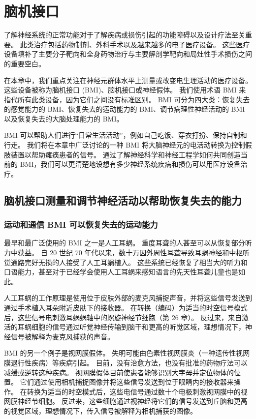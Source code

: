 \chapter{脑机接口}
了解神经系统的正常功能对于了解疾病或损伤引起的功能障碍以及设计疗法至关重要。 此类治疗包括药物制剂、外科手术以及越来越多的电子医疗设备。 这些医疗设备填补了主要分子靶向和全身药物治疗与主要解剖学靶向和局灶性手术损伤之间的重要空白。

在本章中，我们重点关注在神经元群体水平上测量或改变电生理活动的医疗设备。 这些设备被称为脑机接口 (BMI)、脑机接口或神经假体。 我们使用术语 BMI 来指代所有此类设备，因为它们之间没有标准区别。 BMI 可分为四大类：恢复失去的感觉能力的 BMI、恢复失去的运动能力的 BMI、调节病理性神经活动的 BMI 以及恢复失去的大脑处理能力的 BMI。

BMI 可以帮助人们进行“日常生活活动”，例如自己吃饭、穿衣打扮、保持自制和行走。 我们将在本章中广泛讨论的一种 BMI 将大脑神经元的电活动转换为控制假肢装置以帮助瘫痪患者的信号。 通过了解神经科学和神经工程学如何共同创造当前的 BMI，我们可以更清楚地设想有多少神经系统疾病和损伤可以用医疗设备治疗。

\section{脑机接口测量和调节神经活动以帮助恢复失去的能力}
\subsection{运动和通信 BMI 可以恢复失去的运动能力}
最早和最广泛使用的 BMI 之一是人工耳蜗。 重度耳聋的人甚至可以从恢复部分听力中获益。 自 20 世纪 70 年代以来，数十万因外周性耳聋导致耳蜗神经和中枢听觉通路完好无损的人接受了人工耳蜗植入。 这些系统已经恢复了相当大的听力和口语能力，甚至对于已经学会使用人工耳蜗来感知语言的先天性耳聋儿童也是如此。

人工耳蜗的工作原理是使用位于皮肤外部的麦克风捕捉声音，并将这些信号发送到通过手术植入耳朵附近皮肤下的接收器。 在转换（编码）为适当的时空信号模式后，这些信号电刺激耳蜗蜗轴中的螺旋神经节细胞（第 26 章）。 反过来，来自激活的耳蜗细胞的信号通过听觉神经传输到脑干和更高的听觉区域，理想情况下，神经信号被解释为麦克风捕获的声音。

BMI 的另一个例子是视网膜假体。 失明可能由色素性视网膜炎（一种遗传性视网膜退行性疾病）等疾病引起。 目前，没有治愈方法，也没有批准的药物疗法可以减缓或逆转这种疾病。 视网膜假体目前使患者能够识别大字母并定位物体的位置。 它们通过使用相机捕捉图像并将这些信号发送到位于眼睛内的接收器来操作。 在转换为适当的时空模式后，这些电信号通过数十个电极刺激视网膜中的视网膜神经节细胞。 反过来，这些细胞通过视神经将它们的信号发送到丘脑和更高的视觉区域，理想情况下，传入信号被解释为相机捕获的图像。

